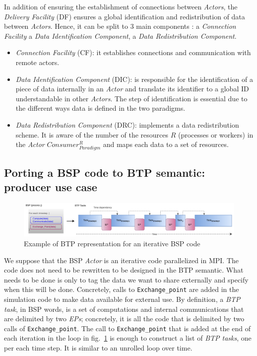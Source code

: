 In addition of ensuring the establishment of connections between \textit{Actors}, the \textit{Delivery Facility} (DF) ensures a global identification and redistribution of data between \textit{Actors}. Hence,  it can be split to 3 main components : a \textit{Connection Facility} a \textit{Data Identification Component}, a \textit{Data Redistribution Component}.
\begin{itemize}
   \item \textit{Connection Facility} (CF): it establishes connections and communication with remote actors.
   \item \textit{Data Identification Component} (DIC): is responsible for the identification of a piece of data internally in an \textit{Actor} and translate its identifier to a global ID understandable in other \textit{Actors}. The step of identification is essential due to the different ways data is defined in the two paradigms. 
   
   \item \textit{Data Redistribution Component} (DRC): implements a data redistribution scheme. It is aware of the number of the resources $R$ (processes or workers) in the \textit{Actor} $Consumer_{Paradigm}^{R}$ and maps each data to a set of resources.
\end{itemize}

\subsection{Porting a BSP code to BTP semantic: producer use case}

\begin{figure}[tb]
\centerline{\includegraphics[width=\textwidth]{figures/unrolled.pdf}}
\caption{Example of BTP representation for an iterative BSP code}
\label{figunroll}
\end{figure}

We suppose that the BSP \textit{Actor} is an iterative code parallelized in MPI. The code does not need to be rewritten to be designed in the BTP semantic. What needs to be done is only to tag the data we want to share externally and specify when this will be done. Concretely, calls to \texttt{Exchange\_point} are added in the simulation code to make data available for external use. By definition, a \textit{BTP task}, in BSP words, is a set of computations and internal communications that are delimited by two \textit{EPs}; concretely, it is all the code that is delimited by two calls of \texttt{Exchange\_point}. The call to \texttt{Exchange\_point} that is added at the end of each iteration in the loop in fig.~\ref{figunroll} is enough to construct a list of \textit{BTP tasks}, one per each time step. It is similar to an unrolled loop over time.


